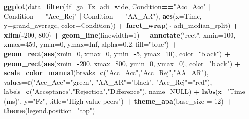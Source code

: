 \documentclass[
]{article}
\newenvironment{Shaded}{\begin{snugshade}}{\end{snugshade}}
\newcommand{\AttributeTok}[1]{\textcolor[rgb]{0.13,0.29,0.53}{#1}}
\newcommand{\ConstantTok}[1]{\textcolor[rgb]{0.56,0.35,0.01}{#1}}
\newcommand{\DecValTok}[1]{\textcolor[rgb]{0.00,0.00,0.81}{#1}}
\newcommand{\FloatTok}[1]{\textcolor[rgb]{0.00,0.00,0.81}{#1}}
\newcommand{\FunctionTok}[1]{\textcolor[rgb]{0.13,0.29,0.53}{\textbf{#1}}}
\newcommand{\NormalTok}[1]{#1}
\newcommand{\OtherTok}[1]{\textcolor[rgb]{0.56,0.35,0.01}{#1}}
\newcommand{\SpecialCharTok}[1]{\textcolor[rgb]{0.81,0.36,0.00}{\textbf{#1}}}
\newcommand{\StringTok}[1]{\textcolor[rgb]{0.31,0.60,0.02}{#1}}
\begin{document}
\begin{Shaded}
\begin{Highlighting}[]
\FunctionTok{ggplot}\NormalTok{(}\AttributeTok{data=}\FunctionTok{filter}\NormalTok{(df\_ga\_Fz\_adi\_wide, Condition}\SpecialCharTok{==}\StringTok{"Acc\_Acc"} \SpecialCharTok{|}\NormalTok{ Condition}\SpecialCharTok{==}\StringTok{"Acc\_Rej"} \SpecialCharTok{|}\NormalTok{ Condition}\SpecialCharTok{==}\StringTok{"AA\_AR"}\NormalTok{), }\FunctionTok{aes}\NormalTok{(}\AttributeTok{x=}\NormalTok{Time, }\AttributeTok{y=}\NormalTok{grand\_average, }\AttributeTok{color=}\NormalTok{Condition)) }\SpecialCharTok{+}
  \FunctionTok{facet\_wrap}\NormalTok{(}\SpecialCharTok{\textasciitilde{}}\NormalTok{ adi\_median\_split) }\SpecialCharTok{+}
  \FunctionTok{xlim}\NormalTok{(}\SpecialCharTok{{-}}\DecValTok{200}\NormalTok{, }\DecValTok{800}\NormalTok{) }\SpecialCharTok{+}
  \FunctionTok{geom\_line}\NormalTok{(}\AttributeTok{linewidth=}\DecValTok{1}\NormalTok{) }\SpecialCharTok{+}
  \FunctionTok{annotate}\NormalTok{(}\StringTok{"rect"}\NormalTok{, }\AttributeTok{xmin=}\DecValTok{100}\NormalTok{, }\AttributeTok{xmax=}\DecValTok{450}\NormalTok{, }\AttributeTok{ymin=}\DecValTok{0}\NormalTok{, }\AttributeTok{ymax=}\ConstantTok{Inf}\NormalTok{, }\AttributeTok{alpha=}\FloatTok{0.2}\NormalTok{, }\AttributeTok{fill=}\StringTok{"blue"}\NormalTok{) }\SpecialCharTok{+}
  \FunctionTok{geom\_rect}\NormalTok{(}\FunctionTok{aes}\NormalTok{(}\AttributeTok{xmin=}\DecValTok{0}\NormalTok{, }\AttributeTok{xmax=}\DecValTok{0}\NormalTok{, }\AttributeTok{ymin=}\SpecialCharTok{{-}}\DecValTok{5}\NormalTok{, }\AttributeTok{ymax=}\DecValTok{10}\NormalTok{), }\AttributeTok{color=}\StringTok{"black"}\NormalTok{) }\SpecialCharTok{+}
  \FunctionTok{geom\_rect}\NormalTok{(}\FunctionTok{aes}\NormalTok{(}\AttributeTok{xmin=}\SpecialCharTok{{-}}\DecValTok{200}\NormalTok{, }\AttributeTok{xmax=}\DecValTok{800}\NormalTok{, }\AttributeTok{ymin=}\DecValTok{0}\NormalTok{, }\AttributeTok{ymax=}\DecValTok{0}\NormalTok{), }\AttributeTok{color=}\StringTok{"black"}\NormalTok{) }\SpecialCharTok{+}
  \FunctionTok{scale\_color\_manual}\NormalTok{(}\AttributeTok{breaks=}\FunctionTok{c}\NormalTok{(}\StringTok{"Acc\_Acc"}\NormalTok{,}\StringTok{"Acc\_Rej"}\NormalTok{,}\StringTok{"AA\_AR"}\NormalTok{),}
                     \AttributeTok{values=}\FunctionTok{c}\NormalTok{(}\StringTok{"Acc\_Acc"}\OtherTok{=}\StringTok{"green"}\NormalTok{, }\StringTok{"AA\_AR"}\OtherTok{=}\StringTok{"black"}\NormalTok{, }\StringTok{"Acc\_Rej"}\OtherTok{=}\StringTok{"red"}\NormalTok{), }
                     \AttributeTok{labels=}\FunctionTok{c}\NormalTok{(}\StringTok{"Acceptance"}\NormalTok{,}\StringTok{"Rejection"}\NormalTok{,}\StringTok{"Difference"}\NormalTok{), }\AttributeTok{name=}\ConstantTok{NULL}\NormalTok{) }\SpecialCharTok{+}
  \FunctionTok{labs}\NormalTok{(}\AttributeTok{x=}\StringTok{"Time (ms)"}\NormalTok{, }\AttributeTok{y=}\StringTok{"Fz"}\NormalTok{, }\AttributeTok{title=}\StringTok{"High value peers"}\NormalTok{) }\SpecialCharTok{+}
  \FunctionTok{theme\_apa}\NormalTok{(}\AttributeTok{base\_size =} \DecValTok{12}\NormalTok{) }\SpecialCharTok{+} \FunctionTok{theme}\NormalTok{(}\AttributeTok{legend.position=}\StringTok{"top"}\NormalTok{)}
\end{Highlighting}
\end{Shaded}
\end{document}
